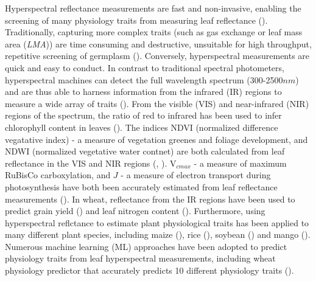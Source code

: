 \documentclass{article}
\begin{document}
Hyperspectral reflectance measurements are fast and non-invasive, enabling the screening of many physiology traits from measuring leaf reflectance (\cite{silva-perez_hyperspectral_2018}). Traditionally, capturing more complex traits (such as gas exchange or leaf mass area (\textit{LMA})) are time consuming and destructive, unsuitable for high throughput, repetitive screening of germplasm (\cite{furbank_wheat_2021}). Conversely, hyperspectral measurements
are quick and easy to conduct. In contrast to traditional spectral photometers, hyperspectral machines can detect the full wavelength spectrum (300-2500$nm$) and are thus able to harness information from the infrared (IR) regions to measure a wide array of traits (\cite{silva-perez_hyperspectral_2018}). From the visible (VIS) and near-infrared (NIR) regions of the spectrum, the ratio of red to infrared has been used to infer chlorophyll content in leaves (\cite{datt_new_1999}). The indices NDVI (normalized difference vegatative index) - a measure of vegetation greenes and foliage development, and NDWI (normalized vegetative water contnet) are both calculated from leaf reflectance in the VIS and NIR regions (\cite{gutierrez_association_2010}, \cite{montesinos-lopez_predicting_2017}). V$_{cmax}$ - a measure of maximum RuBisCo carboxylation, and ${J}$ - a measure of electron transport during photosynthesis have both been accurately estimated from leaf reflectance measurements (\cite{ainsworth_using_2014}). In wheat, reflectance from the IR regions have been used to predict grain yield (\cite{montesinos-lopez_predicting_2017}) and leaf nitrogen content (\cite{yao_evaluation_2015}). Furthermore, using hyperspectral reflctance to estimate plant physiological traits has been applied to many different plant species, including maize (\cite{yendrek_high-throughput_2017}), rice (\cite{das_spectroscopy_2020}), soybean (\cite{ainsworth_using_2014}) and mango (\cite{mahajan_monitoring_2021}). Numerous machine learning (ML) approaches have been adopted to predict physiology traits from leaf hyperspectral measurements, including wheat physiology predictor that accurately predicts 10 different physiology traits (\cite{furbank_wheat_2021}).
\end{document}
